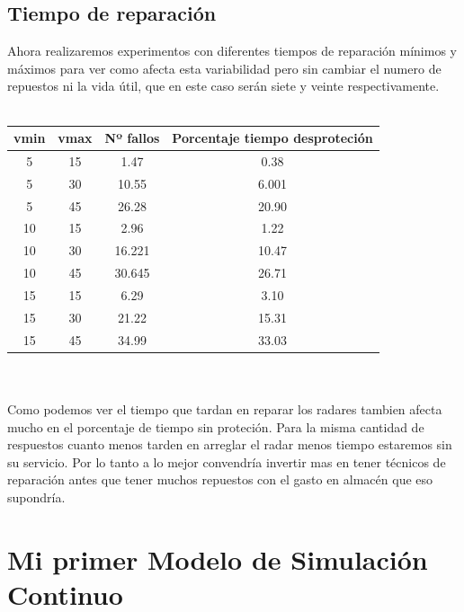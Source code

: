 \documentclass[12pt,a4paper]{article}
\begin{document}
\subsection{Tiempo de reparación}
Ahora realizaremos experimentos con diferentes tiempos de reparación mínimos y máximos para ver como afecta esta variabilidad pero sin cambiar el numero de repuestos ni la vida útil, que en este caso serán siete y veinte respectivamente.\\\\
\begin{tabular}{|c|c|c|c|}
	\hline 
	vmin & vmax & Nº fallos &Porcentaje tiempo desproteción \\ 
	\hline 	
	5 &15 & 1.47  & 0.38 \\
	5 &30 & 10.55  & 6.001 \\
	5 &45 & 26.28  & 20.90 \\ 
		\hline 		\hline 	   
	10 &15 & 2.96  & 1.22 \\ 
	10 &30 & 16.221  & 10.47 \\ 
	10 &45 & 30.645  & 26.71 \\ 
	\hline
	\hline 	   
	15 &15 & 6.29  & 3.10 \\ 
	15 &30 & 21.22  & 15.31 \\ 
	15 &45 & 34.99  & 33.03 \\ 
	\hline  
\end{tabular} 
\\\\
Como podemos ver el tiempo  que tardan en reparar los radares tambien afecta mucho en el porcentaje de tiempo sin proteción. Para la misma cantidad de respuestos cuanto menos tarden en arreglar el radar menos tiempo estaremos sin su servicio. Por lo tanto a lo mejor convendría invertir mas en tener técnicos de reparación antes que tener muchos repuestos con el gasto en almacén que eso supondría. 
\section{Mi primer Modelo de Simulación Continuo}
\end{document}
